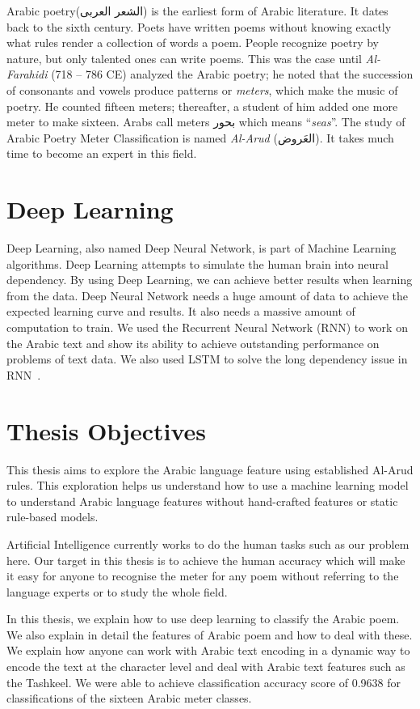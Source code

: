 Arabic poetry(\textarabic{الشعر العربى}) is the earliest form of Arabic literature. It dates back to the sixth century. Poets have written poems without knowing exactly what rules render a collection of words a poem. People recognize poetry by nature, but only talented ones can write poems. This was the case until \textit{Al-Farahidi} (718 – 786 CE) analyzed the Arabic poetry; he noted that the succession of consonants and vowels produce patterns or \textit{meters}, which make the music of poetry. He counted fifteen meters; thereafter, a student of him added one more meter to make sixteen. Arabs call meters \textarabic{بحور} which means ``\textit{seas}''. The study of Arabic Poetry Meter Classification is named \textit{Al-Arud} (\textarabic{العَروض}). It takes much time to become an expert in this field. 
\section{Deep Learning}

Deep Learning, also named Deep Neural Network, is part of Machine Learning algorithms. Deep Learning attempts to simulate the human brain into neural dependency.  By using Deep Learning, we can achieve better results when learning from the data. Deep Neural Network needs a huge amount of data to achieve the expected learning curve and results. It also needs a massive amount of computation to train. We used the Recurrent Neural Network (RNN) to work on the Arabic text and show its ability to achieve outstanding performance on problems of text data. We also used LSTM to solve the long dependency issue in RNN~.

\section{Thesis Objectives}

This thesis aims to explore the Arabic language feature using established Al-Arud rules. This exploration helps us understand how to use a machine learning model to understand Arabic language features without hand-crafted features or static rule-based models.

Artificial Intelligence currently works to do the human tasks such as our problem here. Our target in this thesis is to achieve the human accuracy which will make it easy for anyone to recognise the meter for any poem without referring to the language experts or to study the whole field.

In this thesis, we explain how to use deep learning to classify the Arabic poem. We also explain in detail the features of Arabic poem and how to deal with these. We explain how anyone can work with Arabic text encoding in a dynamic way to encode the text at the character level and deal with Arabic text features such as the Tashkeel. We were able to achieve classification accuracy score of 0.9638 for classifications of the sixteen Arabic meter classes.

